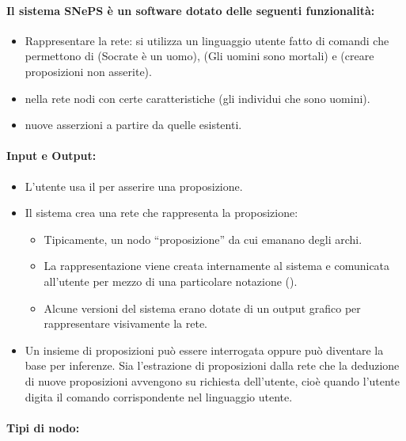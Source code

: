 \paragraph{Il sistema SNePS è un software dotato delle
seguenti funzionalità:}

\begin{itemize}
  \item Rappresentare la rete: si utilizza un linguaggio utente
    fatto di comandi che permettono di 
    (Socrate è un uomo),  (Gli uomini
    sono mortali) e  (creare
proposizioni non asserite). 
\item {} nella rete nodi con certe caratteristiche (gli
individui che sono uomini). 
\item {} nuove asserzioni a partire da quelle esistenti.
\end{itemize}

\paragraph{Input e Output:}

\begin{itemize}
  \item L'utente usa il  per asserire una proposizione.
  \item Il sistema crea una rete che rappresenta la proposizione: 
    \begin{itemize}
      \item Tipicamente, un nodo “proposizione” da cui emanano degli archi. 
      \item La rappresentazione viene creata internamente al sistema e
comunicata all’utente per mezzo di una particolare notazione
(). 
\item Alcune versioni del sistema erano dotate di un output grafico per
rappresentare visivamente la rete. 
    \end{itemize}
  \item Un insieme di proposizioni può essere interrogata oppure può
diventare la base per inferenze. Sia l’estrazione di proposizioni dalla rete che la deduzione di nuove
proposizioni avvengono su richiesta dell’utente, cioè quando l’utente
digita il comando corrispondente nel linguaggio utente. 
\end{itemize}


\paragraph{Tipi di nodo:}

